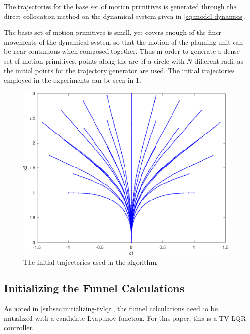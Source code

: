 
The trajectories for the base set of motion primitives is generated through the
direct collocation method on the dynamical system given in
\eqref{eq:model-dynamics}.

The basis set of motion primitives is small, yet covers enough of the finer
movements of the dynamical system so that the motion of the planning unit can be
near continuous when composed together. Thus in order to generate a dense set of
motion primitives, points along the arc of a circle with \(N\) different radii
as the initial points for the trajectory generator are used. The initial
trajectories employed in the experiments can be seen in
\cref{fig:intial-trajectories-exp}.

\begin{figure}[!t]
  \centering
  \includegraphics[width=.8\columnwidth]{figures/experiments/initial-trajectories}
  \caption[The experiment trajectory set]{The initial trajectories used in the
    \rrtfunnel{} algorithm.}
  \label{fig:intial-trajectories-exp}
\end{figure}



\subsection{Initializing the Funnel Calculations}

As noted in \cref{subsec:initializing-tvlqr}, the funnel calculations need to be
initialized with a candidate Lyapunov function. For this paper, this is a TV-LQR controller.

